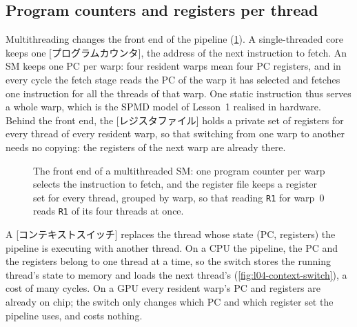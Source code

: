 \documentclass[../main.tex]{subfiles}
\begin{document}
\subsection{Program counters and registers per thread}

Multithreading changes the front end of the pipeline
(\cref{fig:l04-warp-state}).  A single-threaded core keeps one
[プログラムカウンタ], the address of the next
instruction to fetch.  An SM keeps one PC per warp: four resident warps
mean four PC registers, and in every cycle the fetch stage reads the PC
of the warp it has selected and fetches one instruction for all the
threads of that warp.  One static instruction thus serves a whole warp,
which is the SPMD model of Lesson~1 realised in hardware.  Behind the
front end, the [レジスタファイル] holds a private set
of registers for every thread of every resident warp, so that switching
from one warp to another needs no copying: the registers of the next
warp are already there.

\begin{figure}[htbp]
  \centering
  
  \caption{The front end of a multithreaded SM: one program counter per
    warp selects the instruction to fetch, and the register file keeps a
    register set for every thread, grouped by warp, so that reading
    \texttt{R1} for warp~0 reads \texttt{R1} of its four threads at
    once.}
  \label{fig:l04-warp-state}
\end{figure}

\begin{definition}
  \label{def:l04-context-switch}
  A [コンテキストスイッチ] replaces the thread whose
  state (PC, registers) the pipeline is executing with another thread.
  On a CPU the pipeline, the PC and the registers belong to one thread
  at a time, so the switch stores the running thread's state to memory
  and loads the next thread's (\cref{fig:l04-context-switch}), a cost
  of many cycles.  On a GPU every resident warp's PC and registers are
  already on chip; the switch only changes which PC and which register
  set the pipeline uses, and costs nothing.
\end{definition}
\end{document}
